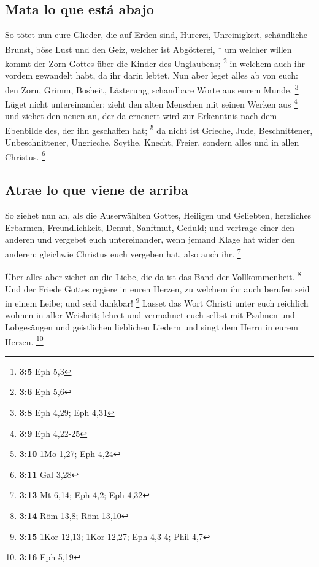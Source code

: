 \hypertarget{mata-lo-que-estuxe1-abajo}{%
\subsection{Mata lo que está abajo}\label{mata-lo-que-estuxe1-abajo}}

 So tötet nun eure Glieder, die auf Erden sind, Hurerei,
Unreinigkeit, schändliche Brunst, böse Lust und den Geiz, welcher ist
Abgötterei, \footnote{\textbf{3:5} Eph 5,3}  um welcher
willen kommt der Zorn Gottes über die Kinder des Unglaubens; \footnote{\textbf{3:6}
  Eph 5,6}  in welchem auch ihr vordem gewandelt habt, da
ihr darin lebtet.  Nun aber leget alles ab von euch: den
Zorn, Grimm, Bosheit, Lästerung, schandbare Worte aus eurem Munde.
\footnote{\textbf{3:8} Eph 4,29; Eph 4,31}  Lüget nicht
untereinander; zieht den alten Menschen mit seinen Werken aus
\footnote{\textbf{3:9} Eph 4,22-25}  und ziehet den neuen
an, der da erneuert wird zur Erkenntnis nach dem Ebenbilde des, der ihn
geschaffen hat; \footnote{\textbf{3:10} 1Mo 1,27; Eph 4,24}
 da nicht ist Grieche, Jude, Beschnittener,
Unbeschnittener, Ungrieche, Scythe, Knecht, Freier, sondern alles und in
allen Christus. \footnote{\textbf{3:11} Gal 3,28}

\hypertarget{atrae-lo-que-viene-de-arriba}{%
\subsection{Atrae lo que viene de
arriba}\label{atrae-lo-que-viene-de-arriba}}

 So ziehet nun an, als die Auserwählten Gottes, Heiligen
und Geliebten, herzliches Erbarmen, Freundlichkeit, Demut, Sanftmut,
Geduld;  und vertrage einer den anderen und vergebet euch
untereinander, wenn jemand Klage hat wider den anderen; gleichwie
Christus euch vergeben hat, also auch ihr. \footnote{\textbf{3:13} Mt
  6,14; Eph 4,2; Eph 4,32}

 Über alles aber ziehet an die Liebe, die da ist das Band
der Vollkommenheit. \footnote{\textbf{3:14} Röm 13,8; Röm 13,10}
 Und der Friede Gottes regiere in euren Herzen, zu
welchem ihr auch berufen seid in einem Leibe; und seid dankbar!
\footnote{\textbf{3:15} 1Kor 12,13; 1Kor 12,27; Eph 4,3-4; Phil 4,7}
 Lasset das Wort Christi unter euch reichlich wohnen in
aller Weisheit; lehret und vermahnet euch selbst mit Psalmen und
Lobgesängen und geistlichen lieblichen Liedern und singt dem Herrn in
eurem Herzen. \footnote{\textbf{3:16} Eph 5,19}

